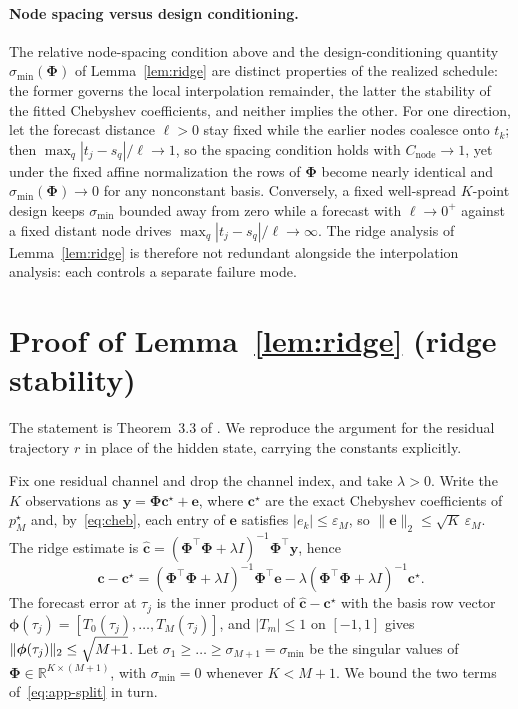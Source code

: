 \paragraph{Node spacing versus design conditioning.}
The relative node-spacing condition above and the design-conditioning
quantity $\sigma_{\min}(\mathbf{\Phi})$ of Lemma~\ref{lem:ridge} are
distinct properties of the realized schedule: the former governs the
local interpolation remainder, the latter the stability of the fitted
Chebyshev coefficients, and neither implies the other. For one
direction, let the forecast distance $\ell > 0$ stay fixed while the
earlier nodes coalesce onto $t_k$; then
$\max_q|t_j - s_q|/\ell \to 1$, so the spacing condition holds with
$C_{\mathrm{node}} \to 1$, yet under the fixed affine normalization
the rows of $\mathbf{\Phi}$ become nearly identical and
$\sigma_{\min}(\mathbf{\Phi}) \to 0$ for any nonconstant basis.
Conversely, a fixed well-spread $K$-point design keeps
$\sigma_{\min}$ bounded away from zero while a forecast with
$\ell \to 0^+$ against a fixed distant node drives
$\max_q|t_j - s_q|/\ell \to \infty$. The ridge analysis of
Lemma~\ref{lem:ridge} is therefore not redundant alongside the
interpolation analysis: each controls a separate failure mode.

\section{Proof of Lemma~\ref{lem:ridge} (ridge stability)}
\label{app:ridge}

The statement is Theorem~3.3 of \citet{spectrum}. We reproduce the
argument for the residual trajectory $r$ in place of the hidden state,
carrying the constants explicitly.

Fix one residual channel and drop the channel index, and take
$\lambda > 0$. Write the $K$
observations as $\mathbf{y} = \mathbf{\Phi}\mathbf{c}^\star + \mathbf{e}$,
where $\mathbf{c}^\star$ are the exact Chebyshev coefficients of
$p_M^\star$ and, by~\eqref{eq:cheb}, each entry of $\mathbf{e}$ satisfies
$|e_k| \le \varepsilon_M$, so $\|\mathbf{e}\|_2 \le \sqrt{K}\,\varepsilon_M$.
The ridge estimate is
$\hat{\mathbf{c}} = (\mathbf{\Phi}^\top\mathbf{\Phi} + \lambda I)^{-1}
\mathbf{\Phi}^\top \mathbf{y}$, hence
\begin{equation}
  \hat{\mathbf{c}} - \mathbf{c}^\star
  = (\mathbf{\Phi}^\top\mathbf{\Phi} + \lambda I)^{-1}\mathbf{\Phi}^\top \mathbf{e}
  - \lambda(\mathbf{\Phi}^\top\mathbf{\Phi} + \lambda I)^{-1}\mathbf{c}^\star.
  \label{eq:app-split}
\end{equation}
The forecast error at $\tau_j$ is the inner product of
$\hat{\mathbf{c}} - \mathbf{c}^\star$ with the basis row vector
$\boldsymbol{\phi}(\tau_j) = [T_0(\tau_j), \dots, T_M(\tau_j)]$, and
$|T_m| \le 1$ on $[-1,1]$ gives
$\|\boldsymbol{\phi}(\tau_j)\|_2 \le \sqrt{M{+}1\strut}$. Let
$\sigma_1 \ge \dots \ge \sigma_{M+1} = \sigma_{\min}$ be the singular
values of $\mathbf{\Phi} \in \mathbb{R}^{K \times (M+1)}$, with
$\sigma_{\min} = 0$ whenever $K < M{+}1$. We bound the two terms
of~\eqref{eq:app-split} in turn.

